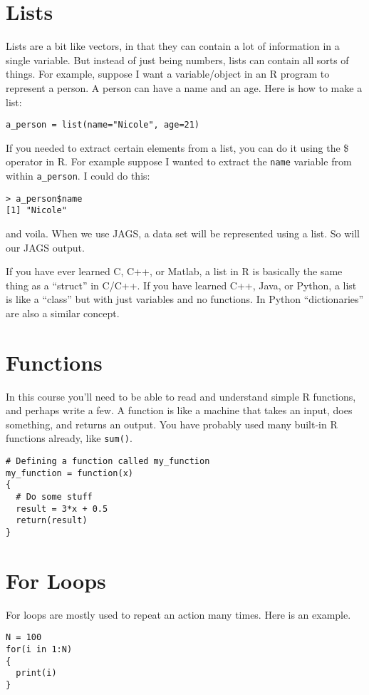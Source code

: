 \section{Lists}
Lists are a bit like vectors, in that they can contain a lot of information in
a single variable. But instead of just being numbers, lists can contain all
sorts of things. For example, suppose I want a variable/object in an R program
to represent a person. A person can have a name and an age. Here is how to make
a list:
\begin{verbatim}
a_person = list(name="Nicole", age=21)
\end{verbatim}
If you needed to extract certain elements from a list, you can do it using the
\$ operator in R. For example suppose I wanted to extract the {\tt name} variable
from within {\tt a\_person}. I could do this:
\begin{verbatim}
> a_person$name
[1] "Nicole"
\end{verbatim}
and voila. When we use JAGS, a data set will be represented using a list.
So will our JAGS output.

If you have ever learned C, C++, or Matlab, a list in R is basically the same thing as
a ``struct'' in C/C++. If you have learned C++, Java, or Python, a list is
like a ``class'' but with just variables and no functions. In Python ``dictionaries''
are also a similar concept.

\section{Functions}
In this course you'll need to be able to read and understand simple R
functions, and perhaps write a few. A function is like a machine that takes
an input, does something, and returns an output. You have probably used many
built-in R functions already, like {\tt sum()}.

\begin{verbatim}
# Defining a function called my_function
my_function = function(x)
{
  # Do some stuff
  result = 3*x + 0.5
  return(result)
}
\end{verbatim}


\section{For Loops}
For loops are mostly used to repeat an action many times. Here is an example.
\begin{verbatim}
N = 100
for(i in 1:N)
{
  print(i)
}
\end{verbatim}

